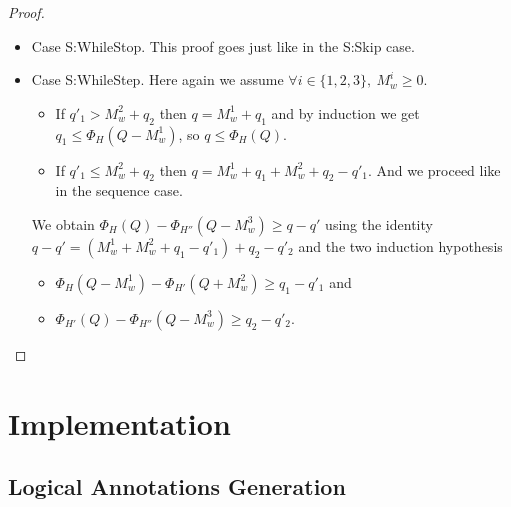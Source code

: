 \documentclass[nocopyrightspace,preprint]{sigplanconf}
\begin{document}
\begin{proof}
\begin{itemize}
\item Case {\sc S:WhileStop}.
  This proof goes just like in the {\sc S:Skip} case.

\item Case {\sc S:WhileStep}.
  Here again we assume $\forall i \in \{1, 2, 3\},~M_w^i \ge 0$.
  \begin{itemize}[topsep=0pt]
  \item
    If $q'_1 > M_w^2 + q_2$ then $q = M_w^1 + q_1$ and by induction
    we get $q_1 \le \Phi_H(Q - M_w^1)$, so $q \le \Phi_H(Q)$.
  \item
    If $q'_1 \le M_w^2 + q_2$ then $q = M_w^1 + q_1 + M_w^2 + q_2 - q'_1$.
    And we proceed like in the sequence case.
  \end{itemize}
  We obtain $\Phi_H(Q) - \Phi_{H''}(Q - M_w^3) \ge q - q'$ using the identity
  $q - q' = (M_w^1 + M_w^2 + q_1 - q'_1) + q_2 - q'_2$ and the two
  induction hypothesis
  \begin{itemize}[topsep=0pt]
  \item $\Phi_H(Q - M_w^1) - \Phi_{H'}(Q + M_w^2) \ge q_1 - q'_1$ and
  \item $\Phi_{H'}(Q) - \Phi_{H''}(Q - M_w^3) \ge q_2 - q'_2.$
  \end{itemize}

\end{itemize}
\end{proof}

\section{Implementation}

\subsection{Logical Annotations Generation}
\end{document}
